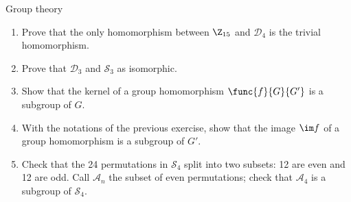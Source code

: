 \documentclass[a4paper, 12pt]{report}
\begin{document}
    \begin{framedprob}{Group theory}
        \begin{enumerate}
            \item Prove that the only homomorphism between $\Z_{15}$ and $\mathcal D_4$ is the trivial homomorphism.
            \item Prove that $\mathcal D_3$ and $\mathcal S_3$ as isomorphic.
            \item Show that the kernel of a group homomorphism $\func{f}{G}{G'}$ is a subgroup of $G$.
            \item With the notations of the previous exercise, show that the image $\im f$ of a group homomorphism is a subgroup of $G'$.
            \item Check that the 24 permutations in $\mathcal S_4$ split into two subsets: 12 are even and 12 are odd. Call $\mathcal A_n$ the subset of even permutations; check that $\mathcal A_4$ is a subgroup of $\mathcal S_4$.
        \end{enumerate}
    \end{framedprob}
\end{document}
